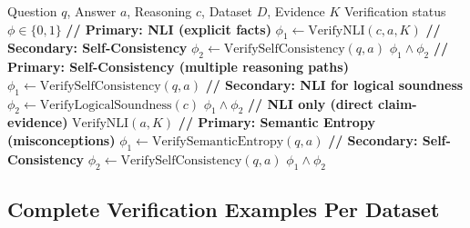 \documentclass[12pt,a4paper]{article}
\theoremstyle{definition}
\begin{document}
\begin{algorithm}[htbp]
\caption{Dataset-Adaptive Multi-Layer Verification}
\begin{algorithmic}[1]
\Require Question $q$, Answer $a$, Reasoning $c$, Dataset $D$, Evidence $K$
\Ensure Verification status $\phi \in \{0, 1\}$
\State
{}
    \State \textbf{// Primary: NLI (explicit facts)}
    \State $\phi_1 \gets \text{VerifyNLI}(c, a, K)$
        \State {} 
    \EndIf
    \State \textbf{// Secondary: Self-Consistency}
    \State $\phi_2 \gets \text{VerifySelfConsistency}(q, a)$
    \State \Return $\phi_1 \land \phi_2$
    \State \textbf{// Primary: Self-Consistency (multiple reasoning paths)}
    \State $\phi_1 \gets \text{VerifySelfConsistency}(q, a)$
        \State {} 
    \EndIf
    \State \textbf{// Secondary: NLI for logical soundness}
    \State $\phi_2 \gets \text{VerifyLogicalSoundness}(c)$
    \State \Return $\phi_1 \land \phi_2$
    \State \textbf{// NLI only (direct claim-evidence)}
    \State \Return $\text{VerifyNLI}(a, K)$
    \State \textbf{// Primary: Semantic Entropy (misconceptions)}
    \State $\phi_1 \gets \text{VerifySemanticEntropy}(q, a)$
        \State {} 
    \EndIf
    \State \textbf{// Secondary: Self-Consistency}
    \State $\phi_2 \gets \text{VerifySelfConsistency}(q, a)$
    \State \Return $\phi_1 \land \phi_2$
\EndIf
\end{algorithmic}
\end{algorithm}

\subsection{Complete Verification Examples Per Dataset}
\end{document}
